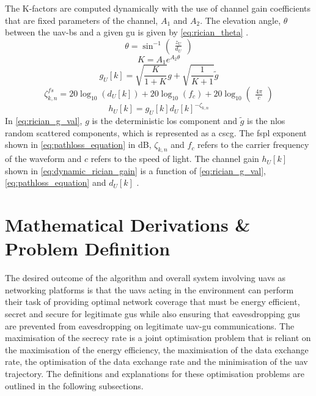 The K-factors are computed dynamically with the use of channel gain coefficients that are fixed parameters of the channel, $A_{1}$ and $A_{2}$. 
The elevation angle, $\theta$ between the \acrshort{uav}-\acrshort{bs} and a given \acrshort{gu} is given by \ref{eq:rician_theta} \cite{you_3d_2019}.
\begin{equation} \label{eq:rician_theta}
   \theta = \sin^{-1}\begin{pmatrix}
       \frac{z_{U}}{d_{U}} 
   \end{pmatrix}
\end{equation}
\begin{equation} \label{eq:dynamic_k_factor}
    K = A_{1} e^{A_{2} \theta}
\end{equation}
\begin{equation} \label{eq:rician_g_val}
    g_{U}[k] = \sqrt{\frac{K}{1+K}} g + \sqrt{\frac{1}{K+1}} \tilde{g}
\end{equation}
\begin{equation} \label{eq:pathloss_equation}
   \zeta_{k, n}^{fs} = 20\log_{10}(d_{U} [k]) + 20\log_{10}(f_{c}) + 20\log_{10} \begin{pmatrix}
       \frac{4\pi}{c}
   \end{pmatrix}
\end{equation}
\begin{equation} \label{eq:dynamic_rician_gain}
   h_{U} [k] = g_{U} [k] d_{U} [k]^{-\zeta_{k, n}}
\end{equation}
In \ref{eq:rician_g_val}, $g$ is the deterministic \acrshort{los} component and $\tilde{g}$ is the \acrfull{nlos} random scattered components, which is represented as a \acrfull{cscg}. 
The \acrfull{fspl} exponent shown in \ref{eq:pathloss_equation} in dB, $\zeta_{k, n}$ and $f_{c}$ refers to the carrier frequency of the waveform and $c$ refers to the speed of light. 
The channel gain $h_{U} [k]$ shown in \ref{eq:dynamic_rician_gain} is a function of \ref{eq:rician_g_val}, \ref{eq:pathloss_equation} and $d_{U} [k]$ \cite{li_joint_2024}. 

\section{Mathematical Derivations \& Problem Definition}
The desired outcome of the algorithm and overall system involving \acrshort{uav}s as networking platforms is that the \acrshort{uav}s acting in the environment can perform their task of providing optimal network coverage that must be energy efficient, secret and secure for legitimate \acrshort{gu}s while also ensuring that eavesdropping \acrshort{gu}s are prevented from eavesdropping on legitimate \acrshort{uav}-\acrshort{gu} communications. 
The maximisation of the secrecy rate is a joint optimisation problem that is reliant on the maximisation of the energy efficiency, the maximisation of the data exchange rate, the optimisation of the data exchange rate and the minimisation of the \acrshort{uav} trajectory. The definitions and explanations for these optimisation problems are outlined in the following subsections. 

